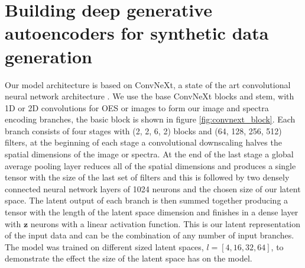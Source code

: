 \documentclass[10pt]{iopart}
\begin{document}





\section{Building deep generative autoencoders for synthetic data generation}\label{aedesign}




Our model architecture is based on ConvNeXt, a state of the art convolutional neural network architecture \cite{liuConvNet2020s2022}. We use the base ConvNeXt blocks and stem, with 1D or 2D convolutions for OES or images to form our image and spectra encoding branches, the basic block is shown in figure \ref{fig:convnext_block}. Each branch consists of four stages with (2, 2, 6, 2) blocks and (64, 128, 256, 512) filters, at the beginning of each stage a convolutional downscaling halves the spatial dimensions of the image or spectra. At the end of the last stage a global average pooling layer reduces all of the spatial dimensions and produces a single tensor with the size of the last set of filters and this is followed by two densely connected neural network layers of 1024 neurons and the chosen size of our latent space. The latent output of each branch is then summed together producing a tensor with the length of the latent space dimension and finishes in a dense layer with $\mathbf{z}$ neurons with a linear activation function. This is our latent representation of the input data and can be the combination of any number of input branches. The model was trained on different sized latent spaces, $l = [4,16,32,64]$, to demonstrate the effect the size of the latent space has on the model.
\end{document}
